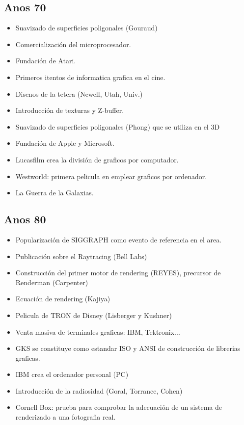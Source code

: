 \subsection{Anos 70}
\begin{itemize}
  \item Suavizado de superficies poligonales (Gouraud)
  \item Comercialización del microprocesador.
  \item Fundación de Atari.
  \item Primeros itentos de informatica grafica en el cine.
  \item Disenos de la tetera (Newell, Utah, Univ.)
  \item Introducción de texturas y Z-buffer.
  \item Suavizado de superficies poligonales (Phong) que se utiliza en el 3D
  \item Fundación de Apple y Microsoft.
  \item Lucasfilm crea la división de graficos por computador.
  \item Westworld: primera pelicula en emplear graficos por ordenador.
  \item La Guerra de la Galaxias.
\end{itemize}

  \subsection{Anos 80}
\begin{itemize}
  \item Popularización de SIGGRAPH como evento de referencia en el area.
  \item Publicación sobre el Raytracing (Bell Labs)
  \item Construcción del primer motor de rendering (REYES), precursor de Renderman (Carpenter)
  \item Ecuación de rendering (Kajiya)
  \item Pelicula de TRON de Disney (Lisberger y Kushner)
  \item Venta masiva de terminales graficas: IBM, Tektronix...
  \item GKS se constituye como estandar ISO y ANSI de construcción de librerias graficas.
  \item IBM crea el ordenador personal (PC)
  \item Introducción de la radiosidad (Goral, Torrance, Cohen)
  \item Cornell Box: prueba para comprobar la adecuación de un sistema de renderizado a una fotografia real.
\end{itemize}

